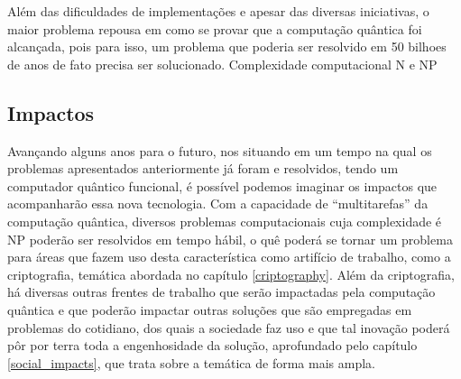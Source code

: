 Além das dificuldades de implementações e apesar das diversas iniciativas, o maior problema repousa em como se provar que a computação quântica foi alcançada, pois para isso, um problema que poderia ser resolvido em 50 bilhoes de anos de fato precisa ser solucionado.
Complexidade computacional N e NP

\subsection{Impactos}
Avançando alguns anos para o futuro, nos situando em um tempo na qual os problemas apresentados anteriormente já foram e resolvidos, tendo um computador quântico funcional, é possível podemos imaginar os impactos que acompanharão essa nova tecnologia. Com a capacidade de “multitarefas” da computação quântica, diversos problemas computacionais cuja complexidade é NP poderão ser resolvidos em tempo hábil, o quê poderá se tornar um problema para áreas que fazem uso desta característica como artifício de trabalho, como a criptografia, temática abordada no capítulo \ref{criptography}.
Além da criptografia, há diversas outras frentes de trabalho que serão impactadas pela computação quântica e que poderão impactar outras soluções que são empregadas em problemas do cotidiano, dos quais a sociedade faz uso e que tal inovação poderá pôr por terra toda a engenhosidade da solução, aprofundado pelo capítulo \ref{social_impacts}, que trata sobre a temática de forma mais ampla.


\newpage